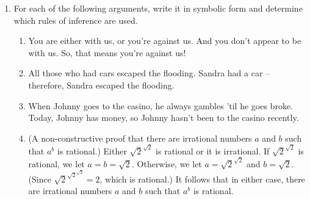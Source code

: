 \begin{enumerate}
\item For each of the following arguments, write it in symbolic form and determine 
which rules of inference are used.

\begin{enumerate}
\item \rule{0pt}{24pt} You are either with us, or you're against us.  And you don't appear to be with us.
So, that means you're against us!



\item \rule{0pt}{24pt} All those who had cars escaped the flooding.  Sandra had a car -- therefore, Sandra
escaped the flooding.


\item \rule{0pt}{24pt}  When Johnny goes to the casino, he always gambles 'til he goes broke.  Today, Johnny
has money, so Johnny hasn't been to the casino recently.
\item \rule{0pt}{24pt} (A non-constructive proof that there are 
irrational numbers $a$ and $b$ such that $a^b$ is rational.)  
Either $\sqrt{2}^{\sqrt{2}}$ is rational or it is irrational.
If $\sqrt{2}^{\sqrt{2}}$ is rational, we let $a=b=\sqrt{2}$.
Otherwise, we let $a=\sqrt{2}^{\sqrt{2}}$ and $b=\sqrt{2}$.
(Since $\sqrt{2}^{\sqrt{2}^{\sqrt{2}}} = 2$, which is rational.) It follows that in either case, there
are irrational numbers $a$ and $b$ such that $a^b$ is rational.


\end{enumerate}



\end{enumerate}
